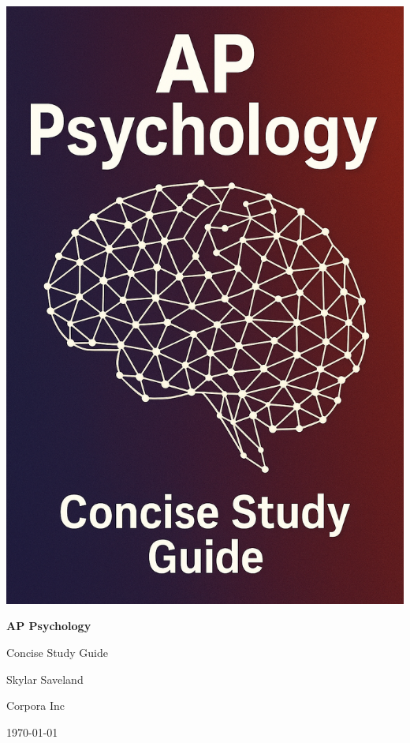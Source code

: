 \thispagestyle{empty}
\noindent
\includegraphics[width=\paperwidth,height=\paperheight]{book-resources/ap-psychology/study-guide-cover.png}%
\restoregeometry
\newpage

\begin{titlepage}
    \centering
    \vspace*{1in}
    {\Huge\bfseries AP Psychology \par}
    {\Large Concise Study Guide \par}
    \vspace{1in}
    {\Large Skylar Saveland\par}
    {\Large Corpora Inc\par}
    \vfill
    {\large \today\par}
\end{titlepage}
